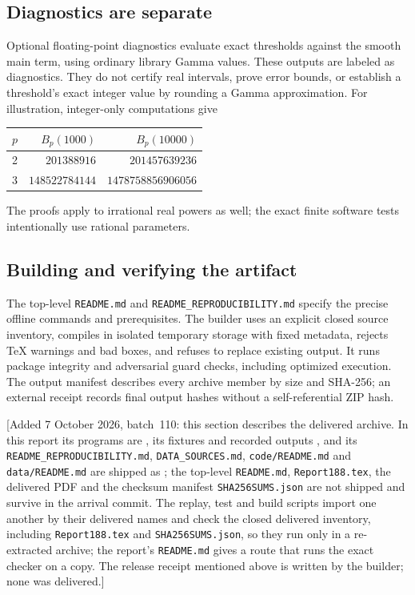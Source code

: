 \subsection{Diagnostics are separate}
Optional floating-point diagnostics evaluate exact thresholds against the smooth main term, using ordinary library Gamma values. These outputs are labeled as diagnostics. They do not certify real intervals, prove error bounds, or establish a threshold's exact integer value by rounding a Gamma approximation. For illustration, integer-only computations give
\begin{center}
\begin{tabular}{@{}rrr@{}}
\toprule
$p$ & $B_p(1000)$ & $B_p(10000)$\\
\midrule
2 & $201388916$ & $201457639236$\\
3 & $148522784144$ & $1478758856906056$\\
\bottomrule
\end{tabular}
\end{center}
The proofs apply to irrational real powers as well; the exact finite software tests intentionally use rational parameters.

\subsection{Building and verifying the artifact}
The top-level \texttt{README.md} and \texttt{README\_REPRODUCIBILITY.md} specify the precise offline commands and prerequisites. The builder uses an explicit closed source inventory, compiles in isolated temporary storage with fixed metadata, rejects \TeX{} warnings and bad boxes, and refuses to replace existing output. It runs package integrity and adversarial guard checks, including optimized execution. The output manifest describes every archive member by size and SHA-256; an external receipt records final output hashes without a self-referential ZIP hash.

[Added 7 October 2026, batch~110: this section describes the delivered
archive. In this report its programs are
, its fixtures and recorded outputs
, and its \texttt{README\_REPRODUCIBILITY.md},
\texttt{DATA\_SOURCES.md}, \texttt{code/README.md} and
\texttt{data/README.md} are shipped as ; the top-level
\texttt{README.md}, \texttt{Report188.tex}, the delivered PDF and the
checksum manifest \texttt{SHA256SUMS.json} are not shipped and survive in
the arrival commit. The replay, test and build scripts import one another
by their delivered names and check the closed delivered inventory,
including \texttt{Report188.tex} and \texttt{SHA256SUMS.json}, so they run
only in a re-extracted archive; the report's \texttt{README.md} gives a
route that runs the exact checker on a copy. The release receipt mentioned
above is written by the builder; none was delivered.]

